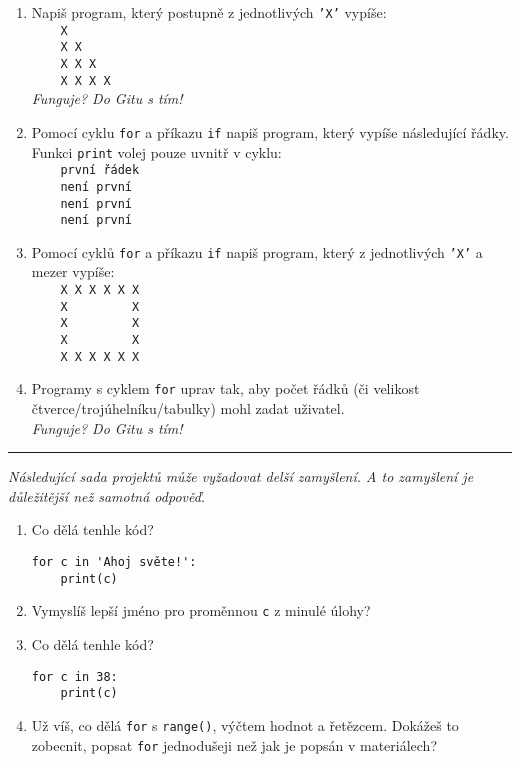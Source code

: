 \documentclass[a4paper,10pt]{article}
\newcommand\startsection[1]{
     \vspace{0.2ex}
    \hrule
    {\fontspec{Oxygen} \tiny
     \vspace{-1ex}
     \emph{#1}
     \vspace{-1.5em}
    }
}
\begin{document}
\begin{enumerate}[resume]
\item Napiš program, který postupně z jednotlivých \texttt{'X'} vypíše:
\\\verb+    X+
\\\verb+    X X+
\\\verb+    X X X+
\\\verb+    X X X X+
    \\\emph{\small Funguje? Do Gitu s tím!}

\item Pomocí cyklu \verb+for+ a příkazu \verb+if+ napiš program, který vypíše následující řádky. Funkci \texttt{print} volej pouze uvnitř v cyklu:
\\\verb+    první řádek+
\\\verb+    není první+
\\\verb+    není první+
\\\verb+    není první+

\item Pomocí cyklů \verb+for+ a příkazu \verb+if+ napiš program,
    který z jednotlivých \texttt{'X'} a mezer vypíše:
\\\verb+    X X X X X X+
\\\verb+    X         X+
\\\verb+    X         X+
\\\verb+    X         X+
\\\verb+    X X X X X X+

\item Programy s cyklem \verb+for+ uprav tak, aby počet řádků
    (či velikost čtverce/trojúhelníku/tabulky)
    mohl zadat uživatel.
    \\\emph{\small Funguje? Do Gitu s tím!}

\end{enumerate}

\startsection{Následující sada projektů může vyžadovat delší zamyšlení. A to zamyšlení je důležitější než samotná odpověď.}

\begin{enumerate}[resume]
\item Co dělá tenhle kód?
\begin{verbatim}
for c in 'Ahoj světe!':
    print(c)
\end{verbatim}

\item Vymyslíš lepší jméno pro proměnnou \verb+c+ z minulé úlohy?

\item Co dělá tenhle kód?
\begin{verbatim}
for c in 38:
    print(c)
\end{verbatim}

\item Už víš, co dělá \texttt{for} s \texttt{range()}, výčtem hodnot a řetězcem.
    Dokážeš to zobecnit, popsat \texttt{for} jednodušeji než jak je popsán v materiálech?

\end{enumerate}
\end{document}
